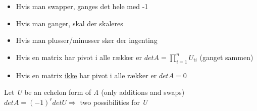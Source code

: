 \documentclass[danish, english]{article}
\begin{document}
\begin{theo} 
\begin{itemize}
\item Hvis man swapper, ganges det hele med -1
\item Hvis man ganger, skal der skaleres
\item Hvis man plusser/minusser sker der ingenting
\item Hvis en matrix har pivot i alle rækker er $det A = \prod\limits_{i=1}^n U_{ii}$ (ganget sammen)
\item Hvis en matrix \underline{ikke} har pivot i alle rækker er $det A = 0$
\end{itemize}
\end{theo}

Let \textit{U} be an echelon form of \textit{A} (only additions and swaps)
\\
$det A = (-1)^r det U \Rightarrow$ two possibilities for \textit{U}
\end{document}
